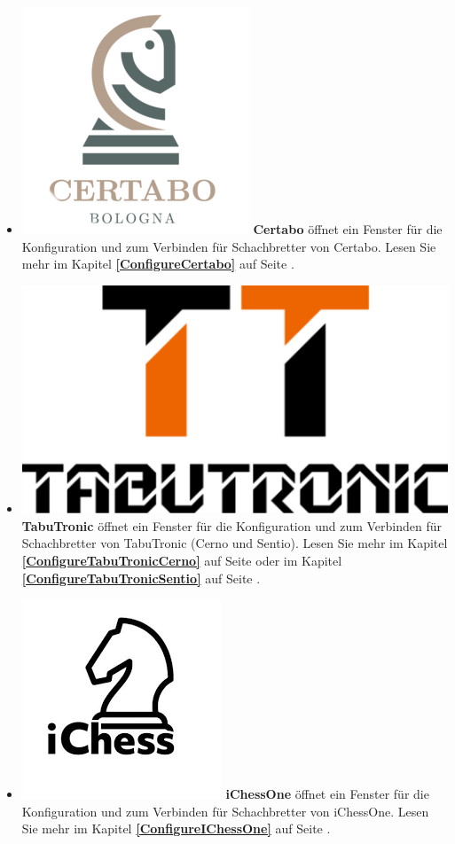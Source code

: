 \documentclass[11pt,a4paper]{article}
\begin{document}
	\begin{itemize}
		\item  \includegraphics[scale=0.1]{Certabo_icon.png} \textbf{Certabo} öffnet ein Fenster für die Konfiguration und zum Verbinden für Schachbretter von Certabo.  Lesen Sie mehr im Kapitel \textbf{\ref{ConfigureCertabo}  } auf Seite \pageref{ConfigureCertabo}.
		\item  \includegraphics[scale=0.05]{tabutronic_logo_def.png} \textbf{TabuTronic} öffnet ein Fenster für die Konfiguration und zum Verbinden für Schachbretter von TabuTronic (Cerno und Sentio). Lesen Sie mehr im Kapitel \textbf{\ref{ConfigureTabuTronicCerno}  } auf Seite \pageref{ConfigureTabuTronicCerno} oder im Kapitel \textbf{\ref{ConfigureTabuTronicSentio}  } auf Seite \pageref{ConfigureTabuTronicSentio}.	
		\item  \includegraphics[scale=0.1]{iChessOneIcon.png} \textbf{iChessOne} öffnet ein Fenster für die Konfiguration und zum Verbinden für Schachbretter von iChessOne.  Lesen Sie mehr im Kapitel \textbf{\ref{ConfigureIChessOne}  } auf Seite \pageref{ConfigureIChessOne}.    

\end{itemize}
\end{document}
